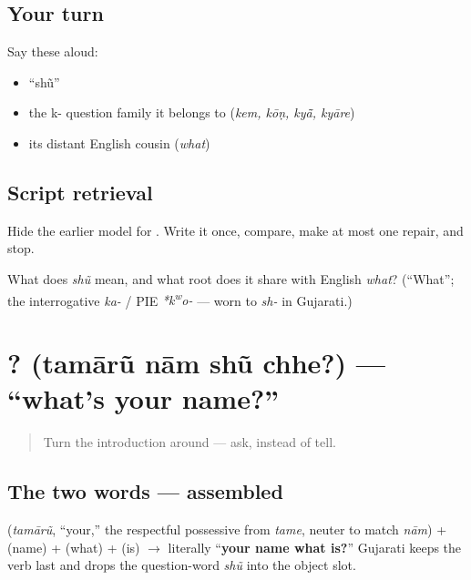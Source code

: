 \subsection*{Your turn}
Say these aloud:

\begin{itemize}
\raggedright
  \item \textquotedblleft{}shũ\textquotedblright{}
  \item the k- question family it belongs to (\emph{kem, kōṇ, kyā̃, kyāre})
  \item its distant English cousin (\emph{what})
\end{itemize}

\subsection*{Script retrieval}
Hide the earlier model for \textbf{}. Write it once, compare, make at most one repair, and stop.

\begin{tcolorbox}[breakable,colback=teal!4,colframe=teal!35!black,title={Before you move on}]
What does \emph{shũ} mean, and what root does it share with English \emph{what}? (\textquotedblleft{}What\textquotedblright{}; the interrogative \emph{ka-} / PIE \emph{*k\textsuperscript{w}o-} — worn to \emph{sh-} in Gujarati.)
\end{tcolorbox}
\section[\gu{તમારું} \gu{નામ} \gu{શું} \gu{છે}?]{   ? (tamārũ nām shũ chhe?) — \textquotedblleft{}what's your name?\textquotedblright{}}

\label{lesson:GU-C02-tamarun-naam-shun-chhe}



\begin{quote}
Turn the introduction around — ask, instead of tell.
\end{quote}

\subsection*{The two words — assembled}
\textbf{} (\emph{tamārũ}, \textquotedblleft{}your,\textquotedblright{} the respectful possessive from \emph{tame}, neuter to match \emph{nām}) + \textbf{} (name) + \textbf{} (what) + \textbf{} (is) $\to$ literally \textquotedblleft{}\textbf{your name what is?}\textquotedblright{} Gujarati keeps the verb last and drops the question-word \emph{shũ} into the object slot.

